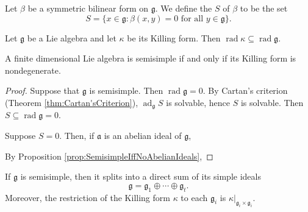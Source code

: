 \documentclass{article}
\DeclareMathOperator{\rad}{rad}
\newcommand*\ad{\operatorname{ad}}
\newcommand*\frka{{\ensuremath{\mathfrak{a}}}}
\newcommand*\frkg{{\ensuremath{\mathfrak{g}}}}
\begin{document}
\begin{definition}
    Let $\beta$ be a symmetric bilinear form on $\frkg$.
    We define the  $S$ of $\beta$ to be the set
    \[
        S
        =
        \{x \in \frkg: \beta(x,y) = 0 \text{ for all } y \in \frkg\}.
    \]
\end{definition}

\begin{lemma}
    Let $\frkg$ be a Lie algebra and let $\kappa$ be its Killing form.
    Then $\rad \kappa \subseteq \rad \frkg$.
\end{lemma}

\begin{proposition}
    \label{prop:SemisimpleIffNondegenerateKillingForm}
    A finite dimensional Lie algebra is semisimple if and only if its Killing form is nondegenerate.
\end{proposition}

\begin{proof}
    Suppose that $\frkg$ is semisimple.
    Then $\rad \frkg = 0$.
    By Cartan's criterion (Theorem \ref{thm:Cartan'sCriterion}), $\ad_\frkg S$ is solvable, hence $S$ is solvable.
    Then $S \subseteq \rad \frkg = 0$.

    Suppose $S = 0$.
    Then, if $\frka$ is an abelian ideal of $\frkg$,
    
    By Proposition \ref{prop:SemisimpleIffNoAbelianIdeals},
\end{proof}

\begin{theorem}
    If $\frkg$ is semisimple, then it splits into a direct sum of its simple ideals
    \[
        \frkg
        =
        \frkg_1 \oplus \cdots \oplus \frkg_t.
    \]
    Moreover, the restriction of the Killing form $\kappa$ to each $\frkg_i$ is $\kappa|_{\frkg_i\times\frkg_i}$.
\end{theorem}
\end{document}
